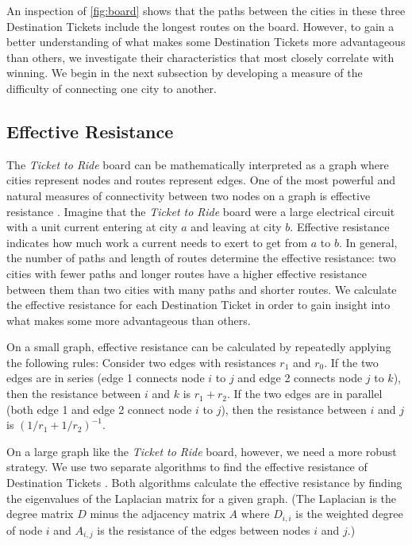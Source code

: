 An inspection of \cref{fig:board} shows that the paths between 
the cities in these three Destination
Tickets include the longest routes on the board.
However, to gain a better understanding of what makes some
Destination Tickets more advantageous than others,
we investigate their characteristics
that most closely correlate with winning.
We begin in the next subsection by developing a measure
of the difficulty of connecting one city to another.

\subsection{Effective Resistance}
\label{sec:resistance}
The \textit{Ticket to Ride} board can be mathematically
interpreted as a graph where cities represent
nodes and routes represent edges.
One of the most powerful and natural measures of connectivity
between two nodes on a graph is effective resistance
\cite{ellens2011effective}.
Imagine that the \textit{Ticket to Ride} board were
a large electrical circuit with a unit current
entering at city $a$ and leaving at city $b$.
Effective resistance indicates
how much work a current needs to exert
to get from $a$ to $b$.
In general, the number of paths and length of routes 
determine the effective resistance:
two cities with fewer paths and longer routes
have a higher effective resistance between them
than two cities with many paths and shorter routes.
We calculate the effective resistance for each 
Destination Ticket in order to gain insight
into what makes some more advantageous than others.

On a small graph, effective resistance can be calculated
by repeatedly applying the following rules:
Consider two edges with resistances $r_1$ and $r_0$.
If the two edges are in series (edge 1 connects node $i$ to $j$
and edge 2 connects node $j$ to $k$), then the resistance between
$i$ and $k$ is $r_1 + r_2$.
If the two edges are in parallel (both edge 1 and edge 2 connect
node $i$ to $j$), then the resistance between $i$ and $j$
is $(1/r_1 + 1/r_2)^{-1}$.

On a large graph like the \textit{Ticket to Ride}
board, however, we need a more robust strategy.
We use two separate algorithms to find the effective resistance
of Destination Tickets
\cite{ellens2011effective, wu2004theory}.
Both algorithms calculate the effective resistance by finding 
the eigenvalues of the Laplacian matrix for a given graph.
(The Laplacian is the degree matrix $D$ minus the adjacency
matrix $A$ where $D_{i,i}$ is the weighted degree of node $i$
and $A_{i,j}$ is the resistance of the edges between nodes
$i$ and $j$.)

